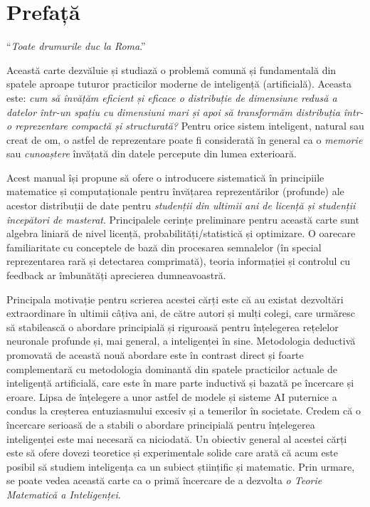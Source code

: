\documentclass[../../book-main_ro.tex]{subfiles}
\begin{document}
\chapter*{Prefață}

\begin{center}
``{\em Toate drumurile duc la Roma}.''

\end{center}
\vspace{5mm}

Această carte dezvăluie și studiază o problemă comună și fundamentală din spatele aproape tuturor practicilor moderne de inteligență (artificială). Aceasta este: {\em cum să învățăm eficient și eficace o distribuție de dimensiune redusă a datelor într-un spațiu cu dimensiuni mari și apoi să transformăm distribuția într-o reprezentare compactă și structurată?} Pentru orice sistem inteligent, natural sau creat de om, o astfel de reprezentare poate fi considerată în general ca o {\em memorie} sau {\em cunoaștere} învățată din datele percepute din lumea exterioară.

Acest manual își propune să ofere o introducere sistematică în principiile matematice și computaționale pentru învățarea reprezentărilor (profunde) ale acestor distribuții de date pentru {\em studenții din ultimii ani de licență și studenții începători de masterat}. Principalele cerințe preliminare pentru această carte sunt algebra liniară de nivel licență, probabilități/statistică și optimizare. O oarecare familiaritate cu conceptele de bază din procesarea semnalelor (în special reprezentarea rară și detectarea comprimată), teoria informației și controlul cu feedback ar îmbunătăți aprecierea dumneavoastră.

Principala motivație pentru scrierea acestei cărți este că au existat dezvoltări extraordinare în ultimii câțiva ani, de către autori și mulți colegi, care urmăresc să stabilească o abordare principială și riguroasă pentru înțelegerea rețelelor neuronale profunde și, mai general, a inteligenței în sine. Metodologia deductivă promovată de această nouă abordare este în contrast direct și foarte complementară cu metodologia dominantă din spatele practicilor actuale de inteligență artificială, care este în mare parte inductivă și bazată pe încercare și eroare. Lipsa de înțelegere a unor astfel de modele și sisteme AI puternice a condus la creșterea entuziasmului excesiv și a temerilor în societate. Credem că o încercare serioasă de a stabili o abordare principială pentru înțelegerea inteligenței este mai necesară ca niciodată. Un obiectiv general al acestei cărți este să ofere dovezi teoretice și experimentale solide care arată că acum este posibil să studiem inteligența ca un subiect științific și matematic. Prin urmare, se poate vedea această carte ca o primă încercare de a dezvolta {\em o Teorie Matematică a Inteligenței}.
\end{document}
